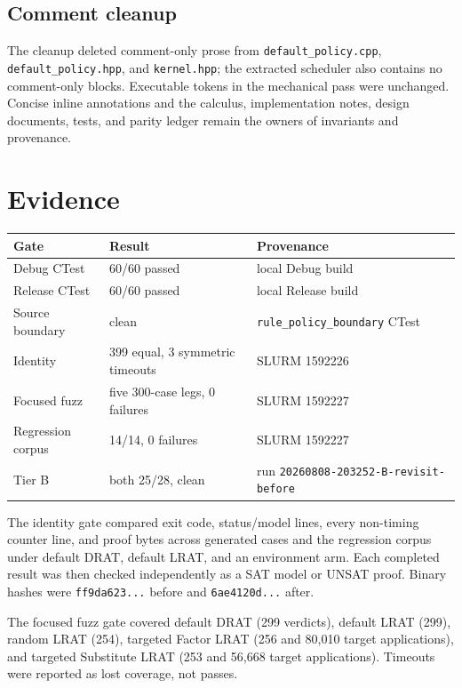 \documentclass[11pt]{article}
\begin{document}
\subsection{Comment cleanup}
The cleanup deleted comment-only prose from
\texttt{default\_policy.cpp}, \texttt{default\_policy.hpp}, and
\texttt{kernel.hpp}; the extracted scheduler also contains no comment-only
blocks.  Executable tokens in the mechanical pass were unchanged.  Concise
inline annotations and the calculus, implementation notes, design documents,
tests, and parity ledger remain the owners of invariants and provenance.

\section{Evidence}
\begin{center}
\begin{tabular}{@{}lll@{}}
\toprule
Gate & Result & Provenance \\
\midrule
Debug CTest & 60/60 passed & local Debug build \\
Release CTest & 60/60 passed & local Release build \\
Source boundary & clean & \texttt{rule\_policy\_boundary} CTest \\
Identity & 399 equal, 3 symmetric timeouts & SLURM 1592226 \\
Focused fuzz & five 300-case legs, 0 failures & SLURM 1592227 \\
Regression corpus & 14/14, 0 failures & SLURM 1592227 \\
Tier B & both 25/28, clean & run \texttt{20260808-203252-B-revisit-before} \\
\bottomrule
\end{tabular}
\end{center}

The identity gate compared exit code, status/model lines, every non-timing
counter line, and proof bytes across generated cases and the regression corpus
under default DRAT, default LRAT, and an environment arm.  Each completed result
was then checked independently as a SAT model or UNSAT proof.  Binary hashes
were \texttt{ff9da623...} before and \texttt{6ae4120d...} after.

The focused fuzz gate covered default DRAT (299 verdicts), default LRAT (299),
random LRAT (254), targeted Factor LRAT (256 and 80,010 target applications),
and targeted Substitute LRAT (253 and 56,668 target applications).  Timeouts
were reported as lost coverage, not passes.
\end{document}
